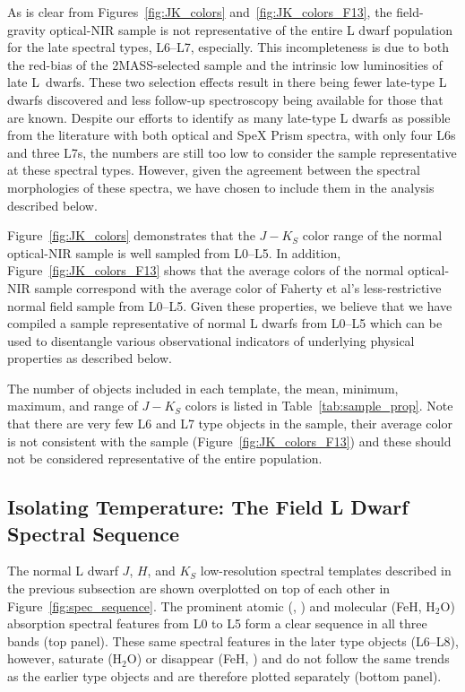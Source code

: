 \documentclass[12pt,preprint]{aastex}
\begin{document}
As is clear from Figures~\ref{fig:JK_colors} and~\ref{fig:JK_colors_F13}, the field-gravity optical-NIR sample is not representative of the entire L dwarf population for the late spectral types, L6--L7, especially. 
This incompleteness is due to both the red-bias of the 2MASS-selected sample and the intrinsic low luminosities of late L~dwarfs.
These two selection effects result in there being fewer late-type L dwarfs discovered and less follow-up spectroscopy being available for those that are known.
Despite our efforts to identify as many late-type L dwarfs as possible from the literature with both optical and SpeX Prism spectra, with only four L6s and three L7s, the numbers are still too low to consider the sample representative at these spectral types.
However, given the agreement between the spectral morphologies of these spectra, we have chosen to include them in the analysis described below.

Figure~\ref{fig:JK_colors} demonstrates that the $J-K_S$ color range of the normal optical-NIR sample is well sampled from L0--L5. 
In addition, Figure~\ref{fig:JK_colors_F13} shows that the average colors of the normal optical-NIR sample correspond with the average color of Faherty et al's less-restrictive normal field sample from L0--L5. 
Given these properties, we believe that we have compiled a sample representative of normal L dwarfs from L0--L5 which can be used to disentangle various observational indicators of underlying physical properties as described below.

The number of objects included in each template, the mean, minimum, maximum, and range of $J-K_S$ colors is listed in Table~\ref{tab:sample_prop}. Note that there are very few L6 and L7 type objects in the sample, their average color is not consistent with the \cite{Faherty13_0355} sample (Figure~\ref{fig:JK_colors_F13}) and these should not be considered representative of the entire population.

\subsection{Isolating Temperature: The Field L Dwarf Spectral Sequence}
\label{sec:temp}
The normal L dwarf $J$, $H$, and $K_S$ low-resolution spectral templates described in the previous subsection are shown overplotted on top of each other in Figure~\ref{fig:spec_sequence}. 
The prominent atomic (, ) and molecular (FeH, H$_2$O) absorption spectral features from L0 to L5 form a clear sequence in all three bands (top panel).
These same spectral features in the later type objects (L6--L8), however, saturate (H$_2$O) or disappear (FeH, ) and do not follow the same trends as the earlier type objects and are therefore plotted separately (bottom panel).
\end{document}
